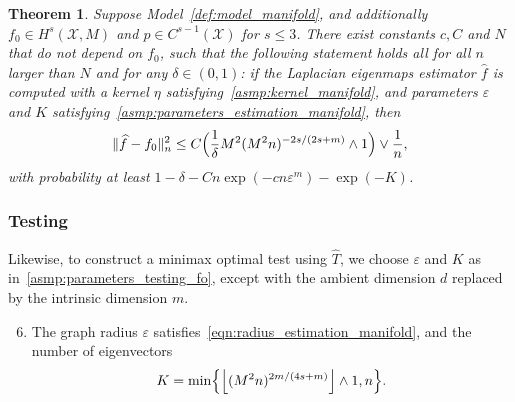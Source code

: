 \documentclass[aos]{imsart}
\theoremstyle{plain}
\newtheorem{theorem}{Theorem}
\theoremstyle{definition}
\theoremstyle{remark}
\newcommand{\wh}[1]{\widehat{#1}}
\newcommand{\mc}[1]{\mathcal{#1}}
\newcommand{\floor}[1]{\left\lfloor #1 \right\rfloor}
\newcommand{\1}{\mathbf{1}}
\begin{document}
\begin{theorem}
	\label{thm:laplacian_eigenmaps_estimation_manifold}
	Suppose Model~\ref{def:model_manifold}, and additionally $f_0 \in H^s(\mc{X},M)$ and $p \in C^{s - 1}(\mc{X})$ for $s \leq 3$. There exist constants $c,C$ and $N$ that do not depend on $f_0$, such that the following statement holds all for all $n$ larger than $N$ and for any $\delta \in (0,1)$: if the Laplacian eigenmaps estimator $\wh{f}$ is computed with a kernel $\eta$ satisfying~\ref{asmp:kernel_manifold}, and parameters $\varepsilon$ and $K$ satisfying~\ref{asmp:parameters_estimation_manifold}, then
	\begin{equation}
	\label{eqn:laplacian_eigenmaps_estimation_manifold}
	\|\wh{f} - f_0\|_n^2 \leq C\Bigl(\frac{1}{\delta}M^2(M^2n)^{-2s/(2s + m)} \wedge 1\Bigr) \vee \frac{1}{n},
	\end{equation}
	with probability at least $1 - \delta - Cn\exp(-cn\varepsilon^m) - \exp(-K)$.
\end{theorem}

\subsubsection{Testing}
Likewise, to construct a minimax optimal test using $\wh{T}$, we choose $\varepsilon$ and $K$ as in~\ref{asmp:parameters_testing_fo}, except with the ambient dimension $d$ replaced by the intrinsic dimension $m$.
\begin{enumerate}[label=(P\arabic*)]
	\setcounter{enumi}{5}
	\item 
	\label{asmp:parameters_testing_manifold}
	The graph radius $\varepsilon$ satisfies~\eqref{eqn:radius_estimation_manifold}, and the number of eigenvectors
	\begin{equation*}
	K = \min\Bigl\{\floor{(M^2n)^{2m/(4s + m)}} \wedge 1,n \Bigr\}.
	\end{equation*}
\end{enumerate}
\end{document}
